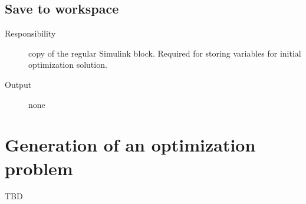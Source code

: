 \documentclass {article}
\begin{document}
\subsection{ Save to workspace}
\begin{description}
  \item [Responsibility]  copy of the regular Simulink block. Required for storing variables for initial optimization solution.
  \item [Output] none
\end{description}



\section{Generation of an optimization problem }

TBD
\end{document}
